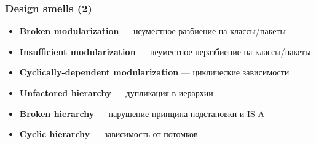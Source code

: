 \documentclass[xetex,mathserif,serif]{beamer}
\begin{document}
	\begin{frame}
		\frametitle{Design smells (2)}
		\begin{itemize}
			\item \textbf{Broken modularization} --- неуместное разбиение на классы/пакеты
			\item \textbf{Insufficient modularization} --- неуместное неразбиение на классы/пакеты
			\item \textbf{Cyclically-dependent modularization} --- циклические зависимости
			\item \textbf{Unfactored hierarchy} --- дупликация в иерархии
			\item \textbf{Broken hierarchy} --- нарушение принципа подстановки и IS-A
			\item \textbf{Cyclic hierarchy} --- зависимость от потомков
		\end{itemize}
	\end{frame}
\end{document}
